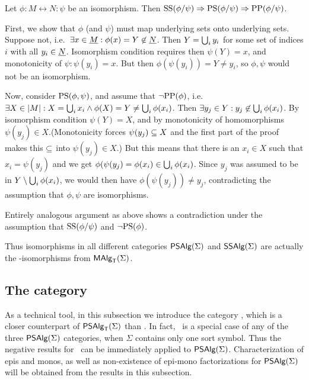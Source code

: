 \documentclass[10pt]{article}
\begin{document}
\begin{Prop}
\label{le:isopp}
Let $\phi:M\leftrightarrow N:\psi$ be an isomorphism. Then
${\rm SS}(\phi/\psi)\Rightarrow{\rm PS}(\phi/\psi)\Rightarrow{\rm PP}(\phi/\psi)$.
\end{Prop}

\begin{Proof}
First, we show that $\phi$ (and $\psi$) must map underlying sets onto
underlying sets.  Suppose not, i.e.\ $\exists x\in\underline {M} :
\phi(x)=Y\not\in\underline {N}$. Then $Y=\bigcup_i y_i$ for some set of
indices $i$ with all $y_i\in\underline {N}$. Isomorphism condition requires
then $\psi(Y)=x$, and monotonicity of $\psi: \psi(y_i)=x$. But then
$\phi(\psi(y_i))=Y\not=y_i$, so $\phi, \psi$ would not be an
isomorphism.

Now, consider ${\rm PS}(\phi,\psi)$, and assume that
$\neg{\rm PP}(\phi)$, i.e.\ $\exists X\in|M| : X=\bigcup_i x_i \land
\phi(X)=Y\not=\bigcup_i \phi(x_i)$. Then $\exists y_j\in
Y:y_j\not\in\bigcup_i \phi(x_i)$.  By isomorphism condition
$\psi(Y)=X$, and by monotonicity of homomorphisms $\psi(y_j)\in
X$.(Monotonicity forces $\psi(y_j)\subseteq X$ and the first part of the
proof makes this $\subseteq$ into $\psi(y_j)\in X$.) But this means that
there is an $x_i\in X$ such that $x_i=\psi(y_j)$ and we get
$\phi(\psi(y_j) = \phi(x_i) \in\bigcup_i \phi(x_i)$. Since $y_j$ was
assumed to be in $Y\setminus{\bigcup_i\phi(x_i)}$, we would then have
$\phi(\psi(y_j))\not= y_j$, contradicting the assumption that $\phi,
\psi$ are isomorphisms.

Entirely analogous argument as above shows a contradiction under the
assumption that ${\rm SS}(\phi/\psi)$ and $\neg{\rm PS}(\phi)$.
\end{Proof}


Thus isomorphisms in all different categories $\mbox{\sf PSAlg}(\Sigma)$ and $\mbox{\sf SSAlg}(\Sigma)$
are actually the \PP-isomorphisms from $\mbox{\rm\sf MAlg}_{\sf T}(\Sigma)$.




\subsection{The category \PSt }

As a technical tool, in this subsection we introduce the category
\PSt, which is a closer counterpart of $\mbox{\sf PSAlg}_{\sf T}(\Sigma)$ than \Set. In fact,
\PSt\ is a special case of any of the three $\mbox{\sf PSAlg}(\Sigma)$ categories, when
$\Sigma$ contains only one sort symbol. Thus the negative results for
\PSt\ can be immediately applied to $\mbox{\sf PSAlg}(\Sigma)$.  Characterization of epis
and monos, as well as non-existence of epi-mono factorizations for
$\mbox{\sf PSAlg}(\Sigma)$ will be obtained from the results in this subsection.
\end{document}
